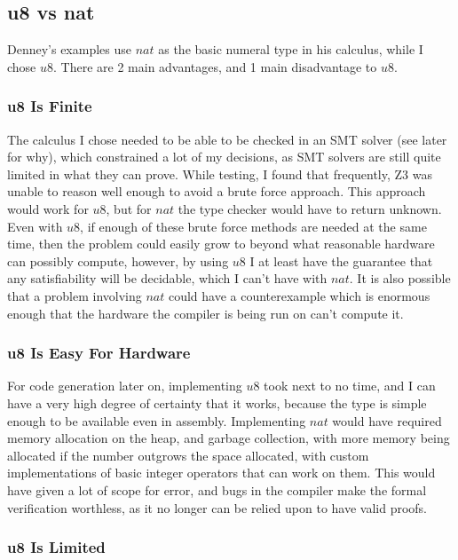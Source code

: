 \subsection{u8 vs nat}

Denney's examples use $nat$ as the basic numeral type in his calculus, while I chose $u8$.
There are 2 main advantages, and 1 main disadvantage to $u8$.

\subsubsection{u8 Is Finite}

The calculus I chose needed to be able to be checked in an SMT solver (see later for why), which
constrained a lot of my decisions, as SMT solvers are still quite limited in what they can prove.
While testing, I found that frequently, Z3 was unable to reason well enough to avoid a brute force
approach.
This approach would work for $u8$, but for $nat$ the type checker would have to return unknown.
Even with $u8$, if enough of these brute force methods are needed at the same time, then the problem could easily
grow to beyond what reasonable hardware can possibly compute, however, by using $u8$ I at least
have the guarantee that any satisfiability will be decidable, which I can't have with $nat$.
It is also possible that a problem involving $nat$ could have a counterexample which is enormous
enough that the hardware the compiler is being run on can't compute it.

\subsubsection{u8 Is Easy For Hardware}

For code generation later on, implementing $u8$ took next to no time, and I can have a very high
degree of certainty that it works, because the type is simple enough to be available even in
assembly.
Implementing $nat$ would have required memory allocation on the heap, and garbage collection,
with more memory being allocated if the number outgrows the space allocated, with custom
implementations of basic integer operators that can work on them.
This would have given a lot of scope for error, and bugs in the compiler make the formal verification
worthless, as it no longer can be relied upon to have valid proofs.

\subsubsection{u8 Is Limited}

